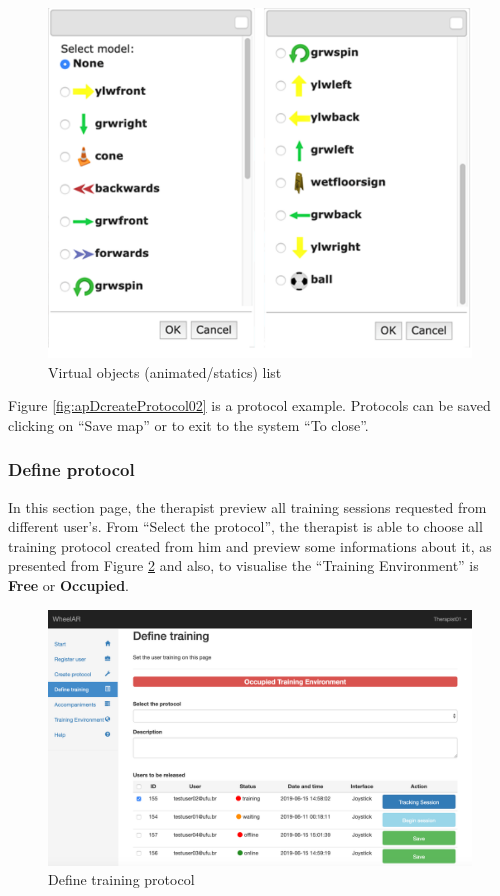 \begin{figure}[!hbt]
\begin{center}
\includegraphics[width=0.5\linewidth]{img/apendiceD/virtualObjects}
\caption{Virtual objects (animated/statics) list} \label{fig:apDvirtualObjects}
\end{center}
\vspace{-15pt}
\end{figure}

Figure \ref{fig:apDcreateProtocol02} is a protocol example. Protocols can be saved clicking on ``Save map'' or to exit to the system ``To close''. 

\subsubsection{Define protocol}
\label{sec:appDefineProcotol}

In this section page, the therapist preview all training sessions requested from different user's. From ``Select the protocol'', the therapist is able to choose all training protocol created from him and preview some informations about it, as presented from Figure \ref{fig:apDtDefineProtocol01} and also, to visualise the ``Training Environment'' is \textbf{Free} or \textbf{Occupied}.

\begin{figure}[!hbt]
\begin{center}
\includegraphics[width=1\linewidth]{img/apendiceD/tDefineProtocol01}
\caption{Define training protocol} \label{fig:apDtDefineProtocol01}
\end{center}
\vspace{-15pt}
\end{figure}

